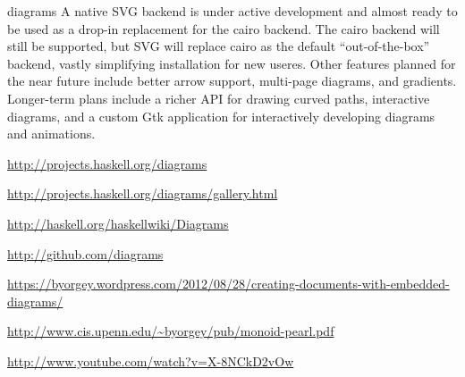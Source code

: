 \begin{hcarentry}[updated]{diagrams}
A native SVG backend is under active development and almost ready to
be used as a drop-in replacement for the cairo backend.  The cairo
backend will still be supported, but SVG will replace cairo as the
default ``out-of-the-box'' backend, vastly simplifying installation
for new useres. Other features planned for the near future include
better arrow support, multi-page diagrams, and gradients.  Longer-term
plans include a richer API for drawing curved paths, interactive
diagrams, and a custom Gtk application for interactively developing
diagrams and animations.

\FurtherReading
\begin{compactitem}
\item \url{http://projects.haskell.org/diagrams}
\item \url{http://projects.haskell.org/diagrams/gallery.html}
\item \url{http://haskell.org/haskellwiki/Diagrams}
\item \url{http://github.com/diagrams}
\item
  \url{https://byorgey.wordpress.com/2012/08/28/creating-documents-with-embedded-diagrams/}
\item \url{http://www.cis.upenn.edu/~byorgey/pub/monoid-pearl.pdf}
\item \url{http://www.youtube.com/watch?v=X-8NCkD2vOw}
\end{compactitem}
\end{hcarentry}

